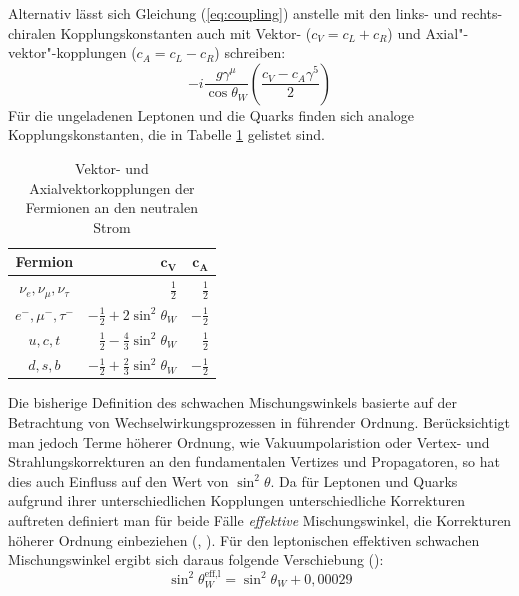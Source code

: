 \pagebreak

Alternativ lässt sich Gleichung (\ref{eq:coupling}) anstelle mit den links-
und rechts-chiralen Kopplungskonstanten auch mit Vektor- \mbox{($c_V=c_L+c_R$)}
und Axial"-vektor"-kopplungen \mbox{($c_A=c_L-c_R$)} schreiben:
\begin{equation}
    -i \frac{g\gamma^\mu}{\cos\theta_W} \left( \frac{c_V-c_A\gamma^5}{2}\right)
    \label{eq:vertex}
\end{equation}
Für die ungeladenen Leptonen und die Quarks finden sich analoge
Kopplungskonstanten, die in Tabelle \ref{tab:couplings} gelistet sind.

\begin{table}[h]
    \centering
    \renewcommand{\arraystretch}{1.4}
    \begin{tabular}{|c|r|r|}
        \hline
        \bf{Fermion} & $\mathbf{c_V}$ & $\mathbf{c_A}$ \\
        \hline \hline
        $\nu_e,\nu_\mu,\nu_\tau$ & $\frac{1}{2}$ & $\frac{1}{2}$ \\
        $e^-,\mu^-,\tau^-$ & $-\frac{1}{2}+2\sin^2\theta_W$ & $-\frac{1}{2}$   \\
        $u,c,t$ & $\frac{1}{2}-\frac{4}{3}\sin^2\theta_W$ & $\frac{1}{2}$   \\
        $d,s,b$ & $-\frac{1}{2}+\frac{2}{3}\sin^2\theta_W$ & $-\frac{1}{2}$ \\
        \hline
    \end{tabular}
    \caption{Vektor- und Axialvektorkopplungen der Fermionen an den neutralen
        Strom}
    \label{tab:couplings}
\end{table}

Die bisherige Definition des schwachen Mischungswinkels basierte auf der
Betrachtung von Wechselwirkungsprozessen in führender Ordnung. Berücksichtigt
man jedoch Terme höherer Ordnung, wie Vakuumpolaristion oder Vertex- und
Strahlungskorrekturen an den fundamentalen Vertizes und Propagatoren, so hat
dies auch Einfluss auf den Wert von $\sin^2\theta$. Da für Leptonen und Quarks
aufgrund ihrer unterschiedlichen Kopplungen unterschiedliche Korrekturen
auftreten definiert man für beide Fälle \textit{effektive} Mischungswinkel, die
Korrekturen höherer Ordnung einbeziehen (\cite{Baur:1997wa},
\cite{CarloniCalame:2005vc}). Für den leptonischen effektiven schwachen
Mischungswinkel ergibt sich daraus folgende Verschiebung
(\cite{PhysRevD.86.010001}):
\begin{equation}
    \sin^2\theta_W^\text{eff,l} = \sin^2\theta_W + 0,00029
    \label{eq:effective_angle}
\end{equation}

